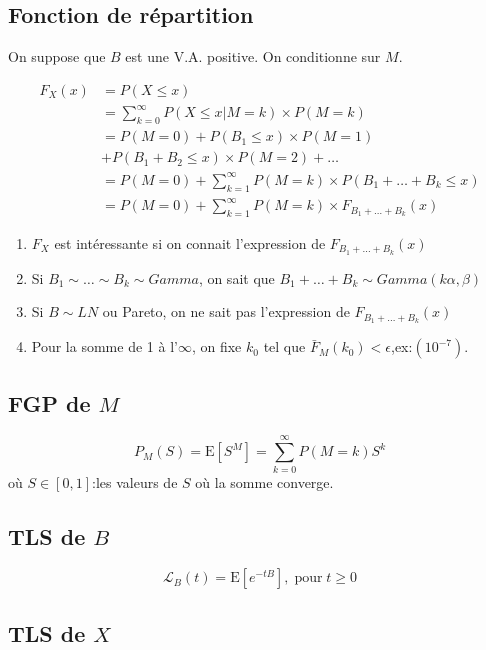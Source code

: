 \subsection{Fonction de répartition}\label{fonction-de-repartition}

On suppose que \(B\) est une V.A. positive. On conditionne sur \(M\).

\begin{align*}
F_X(x)& = P(X\leq x)\\
& = \sum^\infty_{k=0} P(X \leq x|M=k) \times P(M=k)\\
& =P(M=0) + P(B_1 \leq x) \times P(M=1)\\
& +P(B_1+B_2 \leq x) \times P(M=2)+ \dots\\
& =P(M=0) + \sum^\infty_{k=1} P(M=k) \times P(B_1+ \dots + B_k \leq x)\\
& =P(M=0) + \sum^\infty_{k=1} P(M=k) \times F_{B_1+ \dots +B_k} (x)   
\end{align*}

\begin{enumerate}
\item ${F}_X$ est intéressante si on connait l'expression de $F_{B_1+ \dots +B_k} (x)$
\item Si $B_1 \sim \dots \sim B_k \sim Gamma$, on sait que $B_1+ \dots +B_k \sim Gamma(k\alpha,\beta)$
\item Si $B \sim LN$ ou Pareto, on ne sait pas l'expression de $F_{B_1+ \dots +B_k} (x)$
\item Pour la somme de 1 à l'$\infty$, on fixe $k_0$ tel que $\bar{F}_M(k_0)<\epsilon$,ex:$(10^{-7})$.
\end{enumerate}

\subsection{FGP de \(M\)}\label{fgp-de-m}

\[
P_M(S)=\text{E}[S^M]=\sum^\infty_{k=0} P(M=k)S^k 
\] où \(S\in [0,1]\):les valeurs de \(S\) où la somme converge.

\subsection{TLS de \(B\)}\label{tls-de-b}

\[
\mathcal{L}_B(t)=\text{E}[e^{-tB}],\;\text{pour}\;t\geq 0
\]

\subsection{TLS de \(X\)}\label{tls-de-x}

